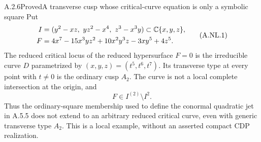 
\begin{statement}{A.2.6}{Proved}{A transverse cusp whose critical-curve equation is only a symbolic square}
Put
\[
 \begin{aligned}
 I&=(y^2-xz,\ yz^2-x^4,\ z^3-x^3y)\subset\mathbb C\{x,y,z\},\\
 F&=4x^7-15x^3yz^2+10x^2y^3z-3xy^5+4z^5.
 \end{aligned}                                                   \tag{A.NL.1}
\]
The reduced critical locus of the reduced hypersurface $F=0$ is the
irreducible curve $D$ parametrized by $(x,y,z)=(t^5,t^6,t^7)$.
Its transverse type at every point with $t\ne0$ is the ordinary cusp
$A_2$. The curve is not a local complete intersection at the origin,
and
\[
             F\in I^{(2)}\setminus I^2.                         \tag{A.NL.2}
\]
Thus the ordinary-square membership used to define the conormal
quadratic jet in A.5.5 does not extend to an arbitrary reduced
critical curve, even with generic transverse type $A_2$.
This is a local example, without an asserted compact CDP realization.
\end{statement}
